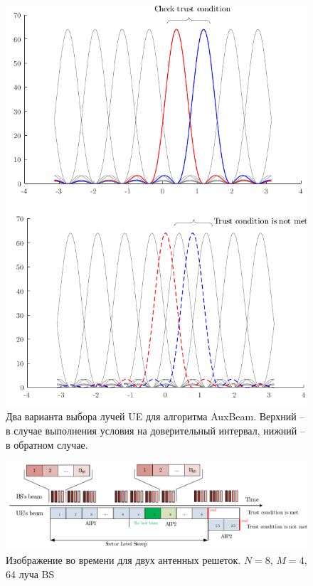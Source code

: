 \begin{figure}[h!]
    \centering
    \includegraphics{figs/fig4.16}
    \caption{Два варианта выбора лучей UE для алгоритма AuxBeam. Верхний -- в случае выполнения условия на доверительный интервал, нижний -- в обратном случае.}
    \label{fig:4.17}
\end{figure}


\begin{figure}[h!]
    \centering
    \includegraphics[width=\linewidth]{figs/fig4.17}
    \caption{Изображение \AuxBeam во времени для двух антенных решеток. $N=8$, $M=4$, 64 луча BS}
    \label{fig:timeline:auxbeam}
\end{figure}

